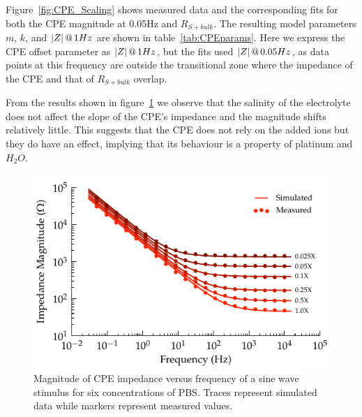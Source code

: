 \documentclass[journal, a4paper]{IEEEtran}
\begin{document}
Figure~\ref{fig:CPE_Scaling} shows measured data and the corresponding fits for both the CPE magnitude at 0.05\thinspace Hz and $R_{S+bulk}$.
The resulting model parameters $m$, $k$, and $|Z|\thinspace @\thinspace 1Hz$ are shown in table~\ref{tab:CPEparams}. Here we express the CPE offset parameter as $|Z|\thinspace @ \thinspace 1Hz$, but the fits used $|Z|\thinspace @ \thinspace 0.05Hz$, as data points at this frequency are outside the transitional zone where the impedance of the CPE and that of $R_{S+bulk}$ overlap.

From the results shown in figure~\ref{fig:CPE_Magnitude} we observe that the salinity of the electrolyte does not affect the slope of the CPE's impedance and the magnitude shifts relatively little. This suggests that the CPE does not rely on the added ions but they do have an effect, implying that its behaviour is a property of platinum and $H_{2}O$.

\begin{figure}
    \begin{center}
        \includegraphics{graphics/displacement_impedanceVsFrequency_magnitude}
    \end{center}
    \caption{Magnitude of CPE impedance versus frequency of a sine wave stimulus for six concentrations of PBS. Traces represent simulated data while markers represent measured values.}
    \label{fig:CPE_Magnitude}
\end{figure}
\end{document}
